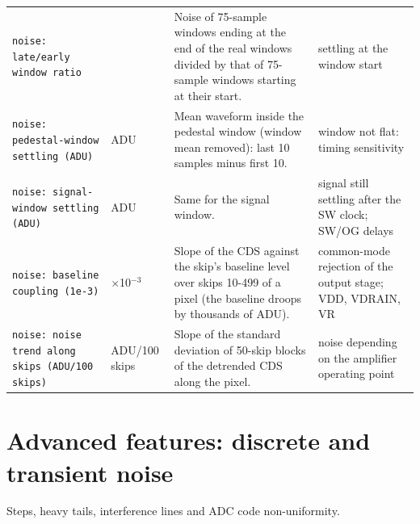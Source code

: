 \documentclass[10pt]{article}
\begin{document}
\begin{longtable}{>{\raggedright\arraybackslash}p{}>{\raggedright\arraybackslash}p{}>{\raggedright\arraybackslash}p{}>{\raggedright\arraybackslash}p{}}
\texttt{noise: late/early window ratio} &  & Noise of 75-sample windows ending at the end of the real windows divided by that of 75-sample windows starting at their start. & settling at the window start \\
\texttt{noise: pedestal-window settling (ADU)} & ADU & Mean waveform inside the pedestal window (window mean removed): last 10 samples minus first 10. & window not flat: timing sensitivity \\
\texttt{noise: signal-window settling (ADU)} & ADU & Same for the signal window. & signal still settling after the SW clock; SW/OG delays \\
\texttt{noise: baseline coupling (1e-3)} & $\times$10$^{-3}$ & Slope of the CDS against the skip's baseline level over skips 10-499 of a pixel (the baseline droops by thousands of ADU). & common-mode rejection of the output stage; VDD, VDRAIN, VR \\
\texttt{noise: noise trend along skips (ADU/100 skips)} & ADU/100 skips & Slope of the standard deviation of 50-skip blocks of the detrended CDS along the pixel. & noise depending on the amplifier operating point \\
\end{longtable}

\section{Advanced features: discrete and transient noise}
Steps, heavy tails, interference lines and ADC code non-uniformity.
\end{document}
